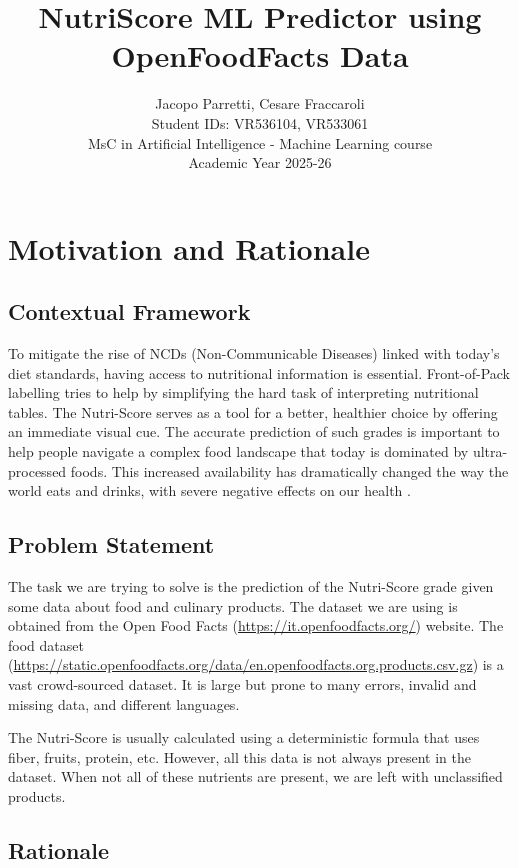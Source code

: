 \documentclass[11pt,a4paper]{article}
\title{\textbf{NutriScore ML Predictor using OpenFoodFacts Data}}
\author{
    Jacopo Parretti, Cesare Fraccaroli \\
    Student IDs: VR536104, VR533061 \\
    MsC in Artificial Intelligence - Machine Learning course\\
    Academic Year 2025-26
}
\date{}
\begin{document}
\maketitle



\tableofcontents

\newpage

\section{Motivation and Rationale}

\subsection{Contextual Framework}

To mitigate the rise of NCDs (Non-Communicable Diseases) linked with today's diet standards, having access to nutritional information is essential.
Front-of-Pack labelling tries to help by simplifying the hard task of interpreting nutritional tables. The Nutri-Score serves as a tool for a better, healthier choice by offering an immediate visual cue. The accurate prediction of such grades is important to help people navigate a complex food landscape that today is dominated by ultra-processed foods.
This increased availability has dramatically changed the way the world eats and drinks, with severe negative effects on our health \cite{ncdalliance}.

\subsection{Problem Statement}

The task we are trying to solve is the prediction of the Nutri-Score grade given some data about food and culinary products. The dataset we are using is obtained from the Open Food Facts (\url{https://it.openfoodfacts.org/}) website. The food dataset (\url{https://static.openfoodfacts.org/data/en.openfoodfacts.org.products.csv.gz}) is a vast crowd-sourced dataset. It is large but prone to many errors, invalid and missing data, and different languages.

The Nutri-Score is usually calculated using a deterministic formula that uses fiber, fruits, protein, etc.
However, all this data is not always present in the dataset.
When not all of these nutrients are present, we are left with unclassified products.

\subsection{Rationale}
\end{document}
